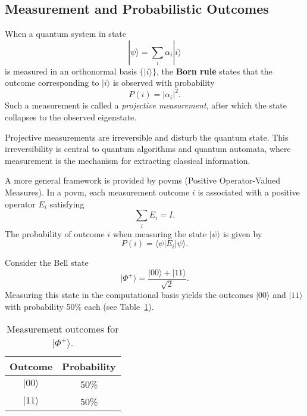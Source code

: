 
\subsection{Measurement and Probabilistic Outcomes}
\label{subsec:measurement}

\begin{definition}
When a quantum system in state
\[
|\psi\rangle = \sum_i \alpha_i |i\rangle
\]
is measured in an orthonormal basis \(\{|i\rangle\}\), the \textbf{Born rule} states that the outcome corresponding to \(|i\rangle\) is observed with probability
\[
P(i) = |\alpha_i|^2.
\]
Such a measurement is called a \emph{projective measurement}, after which the state collapses to the observed eigenstate.
\end{definition}

\begin{remark}
Projective measurements are irreversible and disturb the quantum state. This irreversibility is central to quantum algorithms and quantum automata, where measurement is the mechanism for extracting classical information.
\end{remark}

\begin{definition}
A more general framework is provided by \glspl{povm} (Positive Operator-Valued Measures). In a \gls{povm}, each measurement outcome \(i\) is associated with a positive operator \(E_i\) satisfying
\[
\sum_i E_i = I.
\]
The probability of outcome \(i\) when measuring the state \(|\psi\rangle\) is given by
\[
P(i) = \langle\psi| E_i |\psi\rangle.
\]
\end{definition}

\begin{example}
Consider the Bell state
\[
|\Phi^+\rangle = \frac{|00\rangle + |11\rangle}{\sqrt{2}}.
\]
Measuring this state in the computational basis yields the outcomes \(|00\rangle\) and \(|11\rangle\) with probability 50\% each (see Table~\ref{tab:bell_measurement}).
\end{example}

\begin{table}[h]
\centering
\caption{Measurement outcomes for \(|\Phi^+\rangle\).}
\label{tab:bell_measurement}
\begin{tabular}{|c|c|}
\hline
\textbf{Outcome} & \textbf{Probability} \\ \hline
\( |00\rangle \) & 50\% \\ \hline
\( |11\rangle \) & 50\% \\ \hline
\end{tabular}
\end{table}


